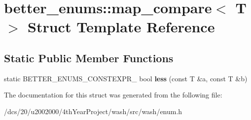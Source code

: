 \hypertarget{structbetter__enums_1_1map__compare}{}\section{better\+\_\+enums\+:\+:map\+\_\+compare$<$ T $>$ Struct Template Reference}
\label{structbetter__enums_1_1map__compare}
\subsection*{Static Public Member Functions}
\begin{DoxyCompactItemize}
\item 
\mbox{\label{structbetter__enums_1_1map__compare_acc484428961e669d7f3e6ac67e86aa52}} 
static B\+E\+T\+T\+E\+R\+\_\+\+E\+N\+U\+M\+S\+\_\+\+C\+O\+N\+S\+T\+E\+X\+P\+R\+\_\+ bool {\bfseries less} (const T \&a, const T \&b)
\end{DoxyCompactItemize}


The documentation for this struct was generated from the following file\+:\begin{DoxyCompactItemize}
\item 
/dcs/20/u2002000/4th\+Year\+Project/wash/src/wash/enum.\+h\end{DoxyCompactItemize}
